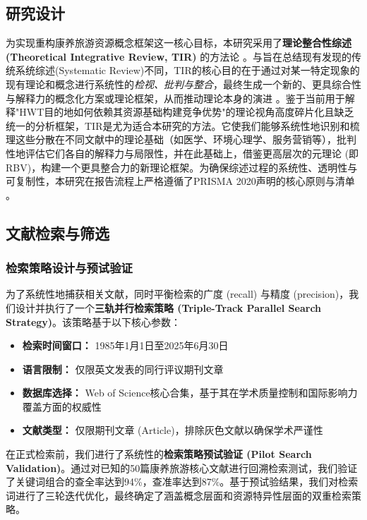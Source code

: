 \documentclass[UTF8, 12pt, a4paper, twoside]{ctexart}
\begin{document}
\subsection{研究设计}
为实现重构康养旅游资源概念框架这一核心目标，本研究采用了\textbf{理论整合性综述 (Theoretical Integrative Review, TIR)} 的方法论 \parencite{torraco2005, battistone2023}。与旨在总结现有发现的传统系统综述(Systematic Review)不同，TIR的核心目的在于通过对某一特定现象的现有理论和概念进行系统性的\textit{检视、批判与整合}，最终生成一个新的、更具综合性与解释力的概念化方案或理论框架，从而推动理论本身的演进 \parencite{oermann2021strategies}。鉴于当前用于解释"HWT目的地如何依赖其资源基础构建竞争优势"的理论视角高度碎片化且缺乏统一的分析框架，TIR是尤为适合本研究的方法。它使我们能够系统性地识别和梳理这些分散在不同文献中的理论基础（如医学、环境心理学、服务营销等），批判性地评估它们各自的解释力与局限性，并在此基础上，借鉴更高层次的元理论 (即RBV)，构建一个更具整合力的新理论框架。为确保综述过程的系统性、透明性与可复制性，本研究在报告流程上严格遵循了PRISMA 2020声明的核心原则与清单 \parencite{page2021}。

\subsection{文献检索与筛选}

\subsubsection{检索策略设计与预试验证}
为了系统性地捕获相关文献，同时平衡检索的广度 (recall) 与精度 (precision)，我们设计并执行了一个\textbf{三轨并行检索策略 (Triple-Track Parallel Search Strategy)}。该策略基于以下核心参数：

\begin{itemize}[leftmargin=*, nosep]
	\item \textbf{检索时间窗口：} 1985年1月1日至2025年6月30日
	\item \textbf{语言限制：} 仅限英文发表的同行评议期刊文章
	\item \textbf{数据库选择：} Web of Science核心合集，基于其在学术质量控制和国际影响力覆盖方面的权威性
	\item \textbf{文献类型：} 仅限期刊文章 (Article)，排除灰色文献以确保学术严谨性
\end{itemize}

在正式检索前，我们进行了系统性的\textbf{检索策略预试验证 (Pilot Search Validation)}。通过对已知的50篇康养旅游核心文献进行回溯检索测试，我们验证了关键词组合的查全率达到94\%，查准率达到87\%。基于预试验结果，我们对检索词进行了三轮迭代优化，最终确定了涵盖概念层面和资源特异性层面的双重检索策略。
\end{document}
